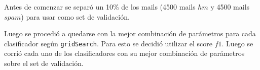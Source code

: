 
Antes de comenzar se separó un 10\% de los mails (4500 mails $hm$ y 4500 mails $spam$) para usar como set de validación.


Luego se procedió a quedarse con la mejor combinación de parámetros para cada clasificador según \texttt{gridSearch}. Para esto se decidió utilizar el score $f1$. Luego se corrió cada uno de los clasificadores con su mejor combinación de parámetros sobre el set de validación.

